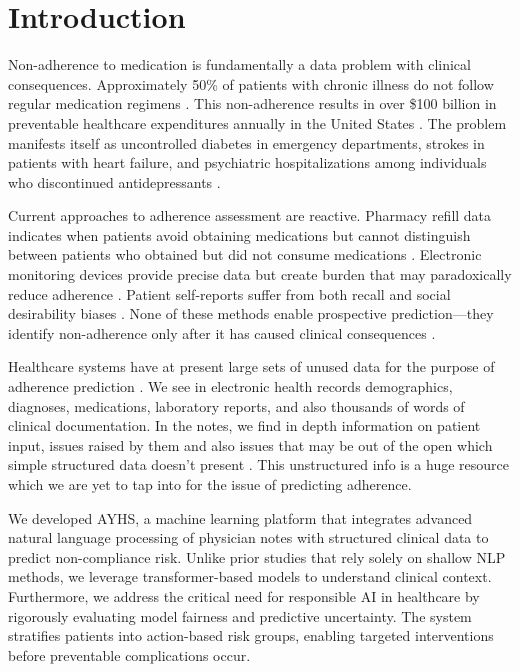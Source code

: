 \documentclass{article}
\begin{document}
\section{Introduction}\label{sec:intro}

Non-adherence to medication is fundamentally a data problem with clinical consequences. Approximately 50\% of patients with chronic illness do not follow regular medication regimens \cite{who2024,brown2016}. This non-adherence results in over \$100 billion in preventable healthcare expenditures annually in the United States \cite{cutler2018,viswanathan2012}. The problem manifests itself as uncontrolled diabetes in emergency departments, strokes in patients with heart failure, and psychiatric hospitalizations among individuals who discontinued antidepressants \cite{baumgartner2018}.

Current approaches to adherence assessment are reactive. Pharmacy refill data indicates when patients avoid obtaining medications but cannot distinguish between patients who obtained but did not consume medications \cite{lo2009}. Electronic monitoring devices provide precise data but create burden that may paradoxically reduce adherence \cite{chan2019}. Patient self-reports suffer from both recall and social desirability biases \cite{garfield2011}. None of these methods enable prospective prediction---they identify non-adherence only after it has caused clinical consequences \cite{cutler2018,kardas2013}.

Healthcare systems have at present large sets of unused data for the purpose of adherence prediction . We see in electronic health records demographics, diagnoses, medications, laboratory reports, and also thousands of words of clinical documentation. In the notes, we find in depth information on patient input, issues raised by them and also issues that may be out of the open which simple structured data doesn't present \cite{vanbulck2024}. This unstructured info is a huge resource which we are yet to tap into for the issue of predicting adherence. 

We developed AYHS, a machine learning platform that integrates advanced natural language processing of physician notes with structured clinical data to predict non-compliance risk. Unlike prior studies that rely solely on shallow NLP methods, we leverage transformer-based models to understand clinical context. Furthermore, we address the critical need for responsible AI in healthcare by rigorously evaluating model fairness and predictive uncertainty. The system stratifies patients into action-based risk groups, enabling targeted interventions before preventable complications occur. 
\end{document}
